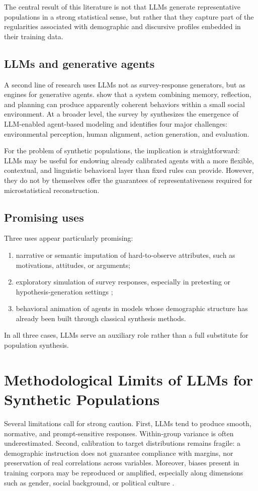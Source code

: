 \documentclass[11pt,a4paper]{article}
\begin{document}
The central result of this literature is not that LLMs generate representative populations in a strong statistical sense, but rather that they capture part of the regularities associated with demographic and discursive profiles embedded in their training data.

\subsection{LLMs and generative agents}
A second line of research uses LLMs not as survey-response generators, but as engines for generative agents. \citet{park2023} show that a system combining memory, reflection, and planning can produce apparently coherent behaviors within a small social environment. At a broader level, the survey by \citet{gao2024} synthesizes the emergence of LLM-enabled agent-based modeling and identifies four major challenges: environmental perception, human alignment, action generation, and evaluation.

For the problem of synthetic populations, the implication is straightforward: LLMs may be useful for endowing already calibrated agents with a more flexible, contextual, and linguistic behavioral layer than fixed rules can provide. However, they do not by themselves offer the guarantees of representativeness required for microstatistical reconstruction.

\subsection{Promising uses}
Three uses appear particularly promising:
\begin{enumerate}
  \item narrative or semantic imputation of hard-to-observe attributes, such as motivations, attitudes, or arguments;
  \item exploratory simulation of survey responses, especially in pretesting or hypothesis-generation settings \citep{sarstedt2024};
  \item behavioral animation of agents in models whose demographic structure has already been built through classical synthesis methods.
\end{enumerate}

In all three cases, LLMs serve an auxiliary role rather than a full substitute for population synthesis.

\section{Methodological Limits of LLMs for Synthetic Populations}
Several limitations call for strong caution. First, LLMs tend to produce smooth, normative, and prompt-sensitive responses. Within-group variance is often underestimated. Second, calibration to target distributions remains fragile: a demographic instruction does not guarantee compliance with margins, nor preservation of real correlations across variables. Moreover, biases present in training corpora may be reproduced or amplified, especially along dimensions such as gender, social background, or political culture \citep{argyle2023,gao2024}.
\end{document}
